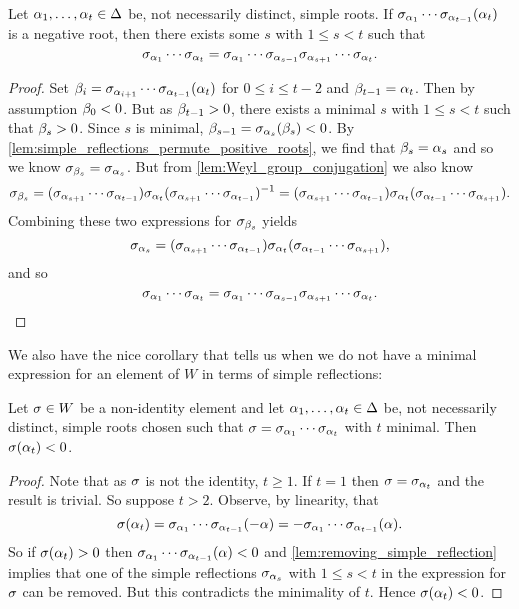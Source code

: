 \documentclass[12pt,reqno,oneside]{amsart}
\begin{document}
    \begin{lemma}\label{lem:removing_simple_reflection}
        Let $\alpha_{1},\ldots,\alpha_{t} \in \Delta$ be, not necessarily distinct, simple roots. If $\sigma_{\alpha_{1}} \cdots \sigma_{\alpha_{t-1}}(\alpha_{t})$ is a negative root, then there exists some $s$ with $1 \le s < t$ such that
        \[
            \sigma_{\alpha_{1}} \cdots \sigma_{\alpha_{t}} = \sigma_{\alpha_{1}} \cdots \sigma_{\alpha_{s-1}}\sigma_{\alpha_{s+1}} \cdots \sigma_{\alpha_{t}}.
        \]
    \end{lemma}
    \begin{proof}
        Set $\beta_{i} = \sigma_{\alpha_{i+1}} \cdots \sigma_{\alpha_{t-1}}(\alpha_{t})$ for $0 \le i \le t-2$ and $\beta_{t-1} = \alpha_{t}$. Then by assumption $\beta_{0} < 0$. But as $\beta_{t-1} > 0$, there exists a minimal $s$ with $1 \le s < t$ such that $\beta_{s} > 0$. Since $s$ is minimal, $\beta_{s-1} = \sigma_{\alpha_{s}}(\beta_{s}) < 0$. By \cref{lem:simple_reflections_permute_positive_roots}, we find that $\beta_{s} = \alpha_{s}$ and so we know $\sigma_{\beta_{s}} = \sigma_{\alpha_{s}}$. But from \cref{lem:Weyl_group_conjugation} we also know
        \[
            \sigma_{\beta_{s}} = (\sigma_{\alpha_{s+1}} \cdots \sigma_{\alpha_{t-1}})\sigma_{\alpha_{t}}(\sigma_{\alpha_{s+1}} \cdots \sigma_{\alpha_{t-1}})^{-1} = (\sigma_{\alpha_{s+1}} \cdots \sigma_{\alpha_{t-1}})\sigma_{\alpha_{t}}(\sigma_{\alpha_{t-1}} \cdots \sigma_{\alpha_{s+1}}).
        \]
        Combining these two expressions for $\sigma_{\beta_{s}}$ yields
        \[
            \sigma_{\alpha_{s}} = (\sigma_{\alpha_{s+1}} \cdots \sigma_{\alpha_{t-1}})\sigma_{\alpha_{t}}(\sigma_{\alpha_{t-1}} \cdots \sigma_{\alpha_{s+1}}),
        \]
        and so
        \[
            \sigma_{\alpha_{1}} \cdots \sigma_{\alpha_{t}} = \sigma_{\alpha_{1}} \cdots \sigma_{\alpha_{s-1}}\sigma_{\alpha_{s+1}} \cdots \sigma_{\alpha_{t}}.
        \]
    \end{proof}

    We also have the nice corollary that tells us when we do not have a minimal expression for an element of $W$ in terms of simple reflections:

    \begin{corollary}\label{cor:reflection_of_first_root_is_negative}
        Let $\sigma \in W$ be a non-identity element and let $\alpha_{1},\ldots,\alpha_{t} \in \Delta$ be, not necessarily distinct, simple roots chosen such that $\sigma = \sigma_{\alpha_{1}} \cdots \sigma_{\alpha_{t}}$ with $t$ minimal. Then $\sigma(\alpha_{t}) < 0$. 
    \end{corollary}
    \begin{proof}
        Note that as $\sigma$ is not the identity, $t \ge 1$. If $t = 1$ then $\sigma = \sigma_{\alpha_{t}}$ and the result is trivial. So suppose $t > 2$. Observe, by linearity, that
        \[
            \sigma(\alpha_{t}) = \sigma_{\alpha_{1}} \cdots \sigma_{\alpha_{t-1}}(-\alpha) = -\sigma_{\alpha_{1}} \cdots \sigma_{\alpha_{t-1}}(\alpha).
        \]
        So if $\sigma(\alpha_{t}) > 0$ then $\sigma_{\alpha_{1}} \cdots \sigma_{\alpha_{t-1}}(\alpha) < 0$ and \cref{lem:removing_simple_reflection} implies that one of the simple reflections $\sigma_{\alpha_{s}}$ with $1 \le s < t$ in the expression for $\sigma$ can be removed. But this contradicts the minimality of $t$. Hence $\sigma(\alpha_{t}) < 0$.
    \end{proof}
\end{document}
